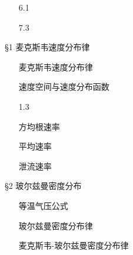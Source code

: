 \documentclass[CJK]{beamer}
\begin{document}
\begin{frame}
\bch
{}
\begin{itemize}
\item[6.1]{}
\item[\cyantext{6.2}]{}
\item[\cyantext{6.3}]{}
\item[\greentext{6.4}]{}
\item[\greentext{6.5}]{}
\end{itemize}
\begin{itemize}
\item[\cyantext{7.1}]{}
\item[\cyantext{7.2}]{}
\item[7.3]{}
\end{itemize}
\ech
\end{frame}

\begin{frame}
\bch
\S{1} 麦克斯韦速度分布律
\begin{itemize}
\item[\blacktext{1.1}]{麦克斯韦速度分布律}
\item[\blacktext{1.2}]{速度空间与速度分布函数}
\item[1.3]{}
\item[\blacktext{1.4}]{方均根速率}
\item[\blacktext{1.5}]{平均速率}
\item[\blacktext{1.6}]{泄流速率}
\end{itemize}

\S{2} 玻尔兹曼密度分布
\begin{itemize}
\item[\blacktext{2.1}]{等温气压公式}
\item[\blacktext{2.2}]{玻尔兹曼密度分布律}
\item[\blacktext{2.3}]{麦克斯韦-玻尔兹曼密度分布律}
\end{itemize}
\ech
\end{frame}
\end{document}
